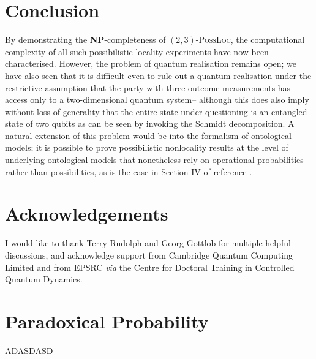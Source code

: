 \documentclass[reprint]{revtex4-1}
\theoremstyle{definition}
\begin{document}
 \section{Conclusion}
 
 By demonstrating the \textbf{NP}-completeness of $(2,3)$-\textsc{PossLoc}, the computational complexity of all such possibilistic locality experiments have now been characterised. However, the problem of quantum realisation remains open; we have also seen that it is difficult even to rule out a quantum realisation under the restrictive assumption that the party with three-outcome measurements has access only to a two-dimensional quantum system-- although this does also imply without loss of generality that the entire state under questioning is an entangled state of two qubits as can be seen by invoking the Schmidt decomposition. A natural extension of this problem would be into the formalism of ontological models; it is possible to prove possibilistic nonlocality results at the level of underlying ontological models that nonetheless rely on operational probabilities rather than possibilities, as is the case in Section IV of reference  \cite{Jevt2015}.

\section*{Acknowledgements}

I would like to thank Terry Rudolph and Georg Gottlob for multiple helpful discussions, and acknowledge support from Cambridge Quantum Computing Limited and from EPSRC \emph{via} the Centre for Doctoral Training in Controlled Quantum Dynamics.

{}


\appendix
\section{Paradoxical Probability}

ADASDASD
\end{document}
